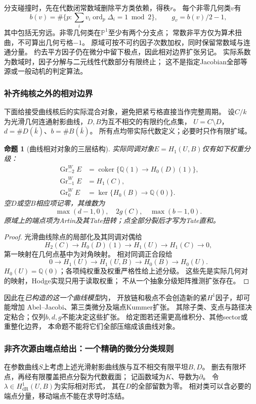 \documentclass[11pt,a4paper,oneside]{ctexart}
\theoremstyle{cnplain}
\newtheorem{proposition}[theorem]{命题}
\theoremstyle{definition}
\theoremstyle{remark}
\newcommand{\Q}{\mathbb Q}
\newcommand{\dR}{\mathrm{dR}}
\numberwithin{equation}{section}
\begin{document}
分支碰撞时，先在代数闭常数域删除平方类依赖，得秩$r$。
每个非零几何类$v$有
\[
 b(v)=\#\{p:\sum_i v_i\operatorname{ord}_p\Delta_i=1\bmod2\},
 \qquad g_v=b(v)/2-1 ,
\]
其中包括无穷远。非零几何类在$\mathbb P^1$至少有两个分支点；
常数非平方仅为算术扭曲，不可算出几何亏格$-1$。
原域可按不可约因子次数加权，同时保留常数域与连通分量。
约去平方因子仍在微分中留下极点，因此相对边界扩张另记。
实际系数为数域时，因子分解与二元线性代数部分有限终止；
这不是指定Jacobian全部等源或一般动机的判定算法。

\subsubsection{补齐纯核之外的相对边界}
下面给接受曲线核后的实际混合对象，避免把紧亏格直接当作完整周期。
设$C/k$为光滑几何连通射影曲线，$D,B$为互不相交的有限约化点集，
$U=C\setminus D$，$d=\#D(\bar k)$、$b=\#B(\bar k)$。
所有点均带实际代数定义；必要时只作有限扩域。

\begin{proposition}[曲线相对对象的三层结构]\label{unified:prop:curve-boundary}
实际同调对象$E=H_1(U,B)$仅有如下权重分级：
\[
 \begin{split}
 \operatorname{Gr}_{-2}^W E
   &=\operatorname{coker}\{\Q(1)\to H_0(D)(1)\},\\
 \operatorname{Gr}_{-1}^W E&=H_1(C),\\
 \operatorname{Gr}_{0}^W E
   &=\ker\{H_0(B)\to\Q(0)\}.
 \end{split}
\]
空$D$或空$B$相应项记零，其维数为
\[
 \max(d-1,0),\quad 2g(C),\quad\max(b-1,0).
\]
原域上的端点项为Artin及其Tate扭转；点全部分裂后才写为Tate直和。
\end{proposition}
\begin{proof}
光滑曲线除点的局部化及其同调对偶给
\[
 H_2(C)\longrightarrow H_0(D)(1)\longrightarrow
 H_1(U)\longrightarrow H_1(C)\longrightarrow0,
\]
第一映射在几何点基中为对角映射。
相对同调正合段给
\[
 0\longrightarrow H_1(U)\longrightarrow H_1(U,B)
 \longrightarrow H_0(B)\longrightarrow H_0(U).
\]
$H_0(U)=\Q(0)$；各项纯权重及权重严格性给上述分级。
这些先是实际几何对的映射，Hodge实现只用于读取权重；
不从一个抽象分级矩阵推测扩张存在。
\end{proof}
因此在\emph{已构造的这一个曲线模型}内，
开放链和极点不会创造新的紧$H^1$因子，却可能增加
Abel--Jacobi、第三类微分及端点Kummer扩张。
其除子类、支点与路径决定粘合；仅列$b,d,g$不能决定这些扩张。
给定图若还需更高维积分、其他sector或重整化边界，
本命题不能将它们全部压缩成该曲线对象。

\subsubsection{非齐次源由端点给出：一个精确的微分分类规则}
在参数曲线$S$上考虑上述光滑射影曲线族与互不相交有限平坦$B,D$。
删去有限坏点，再经有限覆盖把点分裂为代数截面；
记函数域为$K$、导数为$\partial$。
令$\lambda\in H^1_{\dR}(U,B)$为实际相对形式，
其在$D$的全部留数为零。
相对类可以含必要的端点分量，移动端点不能在求导时冻结。
\end{document}
